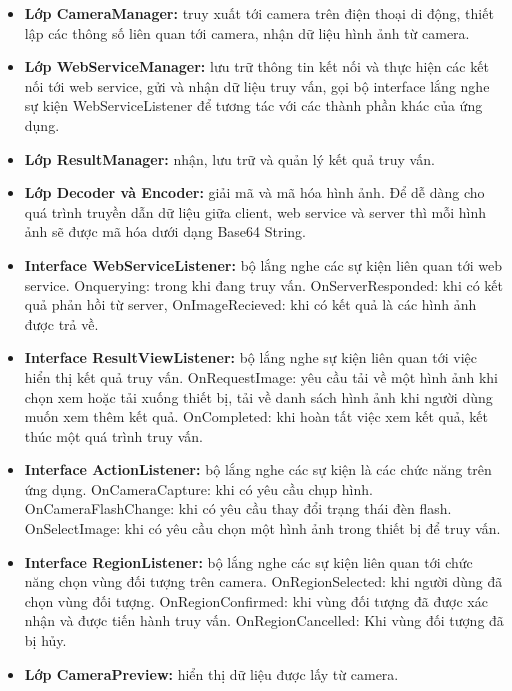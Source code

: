 \begin{itemize}
\item \textbf{Lớp CameraManager:} truy xuất tới camera trên điện thoại di động, thiết lập các thông số liên quan tới camera, nhận dữ liệu hình ảnh từ camera.

\item \textbf{Lớp WebServiceManager:} lưu trữ thông tin kết nối và thực hiện các kết nối tới web service, gửi và nhận dữ liệu truy vấn, gọi bộ interface lắng nghe sự kiện WebServiceListener để tương tác với các thành phần khác của ứng dụng.

\item \textbf{Lớp ResultManager:} nhận, lưu trữ và quản lý kết quả truy vấn.

\item \textbf{Lớp Decoder và Encoder:} giải mã và mã hóa hình ảnh. Để dễ dàng cho quá trình truyền dẫn dữ liệu giữa client, web service và server thì mỗi hình ảnh sẽ được mã hóa dưới dạng Base64 String.

\item \textbf{Interface WebServiceListener:} bộ lắng nghe các sự kiện liên quan tới web service. Onquerying: trong khi đang truy vấn. OnServerResponded: khi có kết quả phản hồi từ server, OnImageRecieved: khi có kết quả là các hình ảnh được trả về.

\item \textbf{Interface ResultViewListener:} bộ lắng nghe sự kiện liên quan tới việc hiển thị kết quả truy vấn. OnRequestImage: yêu cầu tải về một hình ảnh khi chọn xem hoặc tải xuống thiết bị, tải về danh sách hình ảnh khi người dùng muốn xem thêm kết quả. OnCompleted: khi hoàn tất việc xem kết quả, kết thúc một quá trình truy vấn.

\item \textbf{Interface ActionListener:} bộ lắng nghe các sự kiện là các chức năng trên ứng dụng. OnCameraCapture: khi có yêu cầu chụp hình. OnCameraFlashChange: khi có yêu cầu thay đổi trạng thái đèn flash. OnSelectImage: khi có yêu cầu chọn một hình ảnh trong thiết bị để truy vấn.

\item \textbf{Interface RegionListener:} bộ lắng nghe các sự kiện liên quan tới chức năng chọn vùng đối tượng trên camera. OnRegionSelected: khi người dùng đã chọn vùng đối tượng. OnRegionConfirmed: khi vùng đối tượng đã được xác nhận và được tiến hành truy vấn. OnRegionCancelled: Khi vùng đối tượng đã bị hủy.

\item \textbf{Lớp CameraPreview:} hiển thị dữ liệu được lấy từ camera.


\end{itemize}
